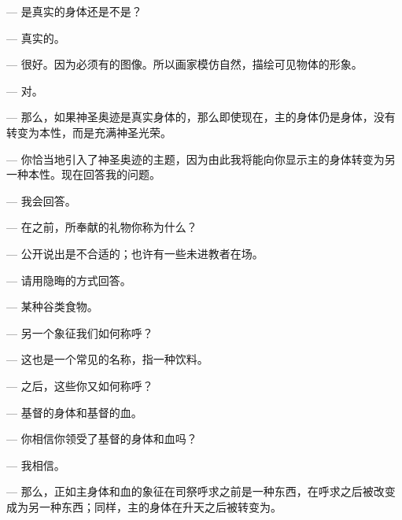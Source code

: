 — 是真实的身体还是不是？\par

— 真实的。\par

— 很好。因为必须有的图像。所以画家模仿自然，描绘可见物体的形象。\par

— 对。\par

— 那么，如果神圣奥迹是真实身体的，那么即使现在，主的身体仍是身体，没有转变为本性，而是充满神圣光荣。\par

— 你恰当地引入了神圣奥迹的主题，因为由此我将能向你显示主的身体转变为另一种本性。现在回答我的问题。\par

— 我会回答。\par

— 在之前，所奉献的礼物你称为什么？\par

— 公开说出是不合适的；也许有一些未进教者在场。\par

— 请用隐晦的方式回答。\par

— 某种谷类食物。\par

— 另一个象征我们如何称呼？\par

— 这也是一个常见的名称，指一种饮料。\par

— 之后，这些你又如何称呼？\par

— 基督的身体和基督的血。\par

— 你相信你领受了基督的身体和血吗？\par

— 我相信。\par

— 那么，正如主身体和血的象征在司祭呼求之前是一种东西，在呼求之后被改变成为另一种东西；同样，主的身体在升天之后被转变为。\par


